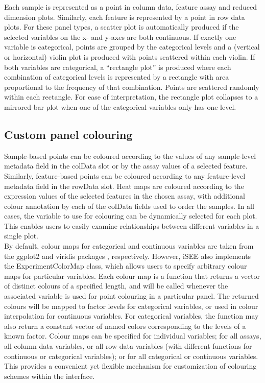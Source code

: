 \documentclass[10pt,a4paper,twocolumn]{article}
\begin{document}
Each sample is represented as a point in column data, feature assay and reduced dimension plots.
Similarly, each feature is represented by a point in row data plots.
For these panel types, a scatter plot is automatically produced if the selected variables on the x- and y-axes are both continuous.
If exactly one variable is categorical, points are grouped by the categorical levels and a (vertical or horizontal) violin plot is produced with points scattered within each violin.
If both variables are categorical, a ``rectangle plot'' is produced where each combination of categorical levels is represented by a rectangle with area proportional to the frequency of that combination.
Points are scattered randomly within each rectangle.
For ease of interpretation, the rectangle plot collapses to a mirrored bar plot when one of the categorical variables only has one level.

\subsection*{Custom panel colouring}
Sample-based points can be coloured according to the values of any sample-level metadata field in the colData slot or by the assay values of a selected feature.
Similarly, feature-based points can be coloured according to any feature-level metadata field in the rowData slot.
Heat maps are coloured according to the expression values of the selected features in the chosen assay,
with additional colour annotation by each of the colData fields used to order the samples.
In all cases, the variable to use for colouring can be dynamically selected for each plot.
This enables users to easily examine relationships between different variables in a single plot. \\

By default, colour maps for categorical and continuous variables are taken from the ggplot2 \citep{wickham2009ggplot2} and viridis packages \citep{garnier2018viridis}, respectively.
However, iSEE also implements the ExperimentColorMap class, which allows users to specify arbitrary colour maps for particular variables.
Each colour map is a function that returns a vector of distinct colours of a specified length, and will be called whenever the associated variable is used for point colouring in a particular panel.
The returned colours will be mapped to factor levels for categorical variables, or used in colour interpolation for continuous variables.
For categorical variables, the function may also return a constant vector of named colors corresponding to the levels of a known factor.
Colour maps can be specified for individual variables; for all assays, all column data variables, or all row data variables (with different functions for continuous or categorical variables); or for all categorical or continuous variables.
This provides a convenient yet flexible mechanism for customization of colouring schemes within the interface.
\end{document}
